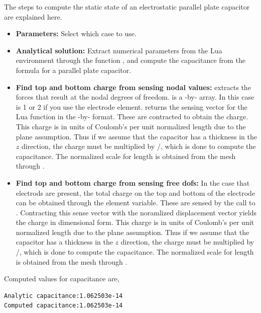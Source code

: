 \clearpage
The steps to compute the static state of an electrostatic 
parallel plate capacitor are 
explained here. 

\begin{itemize}

  \item{\textbf{Parameters:}}
  Select which case to use.

  \item{\textbf{Analytical solution:}}
  Extract numerical parameters from the Lua environment through the 
  function , and compute the capacitance
  from the formula for a parallel plate capacitor.

  \item{\textbf{Find top and bottom charge from sensing nodal values:}}
   extracts the forces that result at the 
  nodal degrees of freedom.  is a -by-
  array. In this case  is 1 or 2 if you use the electrode 
  element.  returns the sensing vector
  for the Lua function in the -by- format. 
  These are contracted to obtain the charge. This charge is in
  units of Coulomb's per unit normalized length due to the plane
  assumption. Thus if we assume that the capacitor has a 
  thickness in the $z$ direction, the charge must be multiplied
  by /, which is done to compute the capacitance.
  The normalized scale for length is obtained from the mesh through
  .

  \item{\textbf{Find top and bottom charge from sensing free dofs:}}
  In the case that electrods are present, the total charge on the
  top and bottom of the electrode can be obtained through the 
  element variable. These are sensed by the call to 
  . Contracting this sense vector
  with the noramlized displacement vector yields the charge in 
  dimensional form. This charge is in
  units of Coulomb's per unit normalized length due to the plane
  assumption. Thus if we assume that the capacitor has a 
  thickness in the $z$ direction, the charge must be multiplied
  by /, which is done to compute the capacitance.
  The normalized scale for length is obtained from the mesh through
  .

\end{itemize}

Computed values for capacitance are,
\begin{verbatim}
Analytic capacitance:1.062503e-14
Computed capacitance:1.062503e-14
\end{verbatim}


